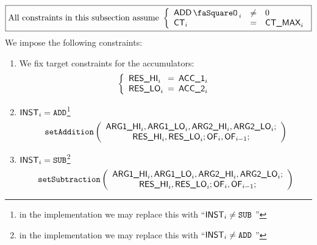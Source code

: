 \[
	\boxed{\text{All constraints in this subsection assume }
	\left\{ \begin{array}{lcl}
		\addStamp_{i} & \neq & 0          \\
		\ct_{i}       & =    & \maxCt_{i} \\
	\end{array} \right. }
\]
We impose the following constraints:
\begin{enumerate}
	\item We fix target constraints for the accumulators:
		\[
			\left\{ \begin{array}{lcl}
				\resHi_{i} & \!\!\! = \!\!\! & \acc{1}_{i} \\
				\resLo_{i} & \!\!\! = \!\!\! & \acc{2}_{i} \\
			\end{array} \right.
		\]
	\item \If $\textsf{INST}_{i} = \texttt{ADD}$\footnote{in the implementation we may replace this with ``\If $\textsf{INST}_{i} \neq \texttt{SUB}$ \Then''}
		\Then
		\[
			\texttt{setAddition}
			\left( \begin{array}{c}
				\textsf{ARG}\textsf{1}\textsf{\_HI}_{i}, \textsf{ARG}\textsf{1}\textsf{\_LO}_{i},
				\textsf{ARG}\textsf{2}\textsf{\_HI}_{i}, \textsf{ARG}\textsf{2}\textsf{\_LO}_{i}; \\
				\textsf{RES}\textsf{\_HI}_{i}, \textsf{RES}\textsf{\_LO}_{i};
				\textsf{OF}_{i},
				\textsf{OF}_{i-1};
			\end{array} \right)
		\]
	\item \If $\textsf{INST}_{i} = \texttt{SUB}$\footnote{in the implementation we may replace this with ``\If $\textsf{INST}_{i} \neq \texttt{ADD}$ \Then''}
		\Then
		\[
			\texttt{setSubtraction}
			\left( \begin{array}{c}
				\textsf{ARG}\textsf{1}\textsf{\_HI}_{i}, \textsf{ARG}\textsf{1}\textsf{\_LO}_{i},
				\textsf{ARG}\textsf{2}\textsf{\_HI}_{i}, \textsf{ARG}\textsf{2}\textsf{\_LO}_{i}; \\
				\textsf{RES}\textsf{\_HI}_{i}, \textsf{RES}\textsf{\_LO}_{i};
				\textsf{OF}_{i},
				\textsf{OF}_{i-1};
			\end{array} \right)
		\]
\end{enumerate}

